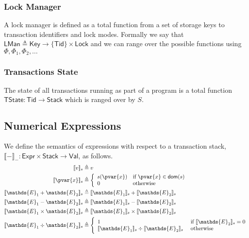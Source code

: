 \subsubsection{Lock Manager}

A lock manager is defined as a total function from a set of storage keys to transaction identifiers and lock modes. Formally we say that $\mathsf{LMan} \triangleq \mathsf{Key} \rightarrow \{ \mathsf{Tid} \} \times \mathsf{Lock}$ and we can range over the possible functions using $\Phi, \Phi_1, \Phi_2, \ldots$

\subsubsection{Transactions State}

The state of all transactions running as part of a program is a total function $\mathsf{TState} : \mathsf{Tid} \rightarrow \mathsf{Stack}$ which is ranged over by $S$.

\subsection{Numerical Expressions}

We define the semantics of expressions with respect to a transaction stack, $\llbracket - \rrbracket_- : \mathsf{Expr} \times \mathsf{Stack} \rightarrow \mathsf{Val}$, as follows.
\begin{align*}
\llbracket v \rrbracket_s &\triangleq v \\
\llbracket \pvar{x} \rrbracket_s &\triangleq
\bigg\{ \begin{array}{l l}
s(\pvar{x}) &\text{if } \pvar{x} \in \textsf{dom}(s)\\
0&\text{otherwise}
\end{array} \\
\llbracket \mathds{E}_1 + \mathds{E}_2 \rrbracket_s &\triangleq \llbracket \mathds{E}_1 \rrbracket_s + \llbracket \mathds{E}_2 \rrbracket_s \\
\llbracket \mathds{E}_1 - \mathds{E}_2 \rrbracket_s &\triangleq \llbracket \mathds{E}_1 \rrbracket_s - \llbracket \mathds{E}_2 \rrbracket_s \\
\llbracket \mathds{E}_1 \times \mathds{E}_2 \rrbracket_s &\triangleq \llbracket \mathds{E}_1 \rrbracket_s \times \llbracket \mathds{E}_2 \rrbracket_s \\
\llbracket \mathds{E}_1 \div \mathds{E}_2 \rrbracket_s &\triangleq 
\Bigg\{ \begin{array}{l l}
1 &\text{ if } \llbracket \mathds{E}_2 \rrbracket_s = 0 \\
\llbracket \mathds{E}_1 \rrbracket_s \div \llbracket \mathds{E}_2 \rrbracket_s &\text{ otherwise} \\
\end{array}
\end{align*}

